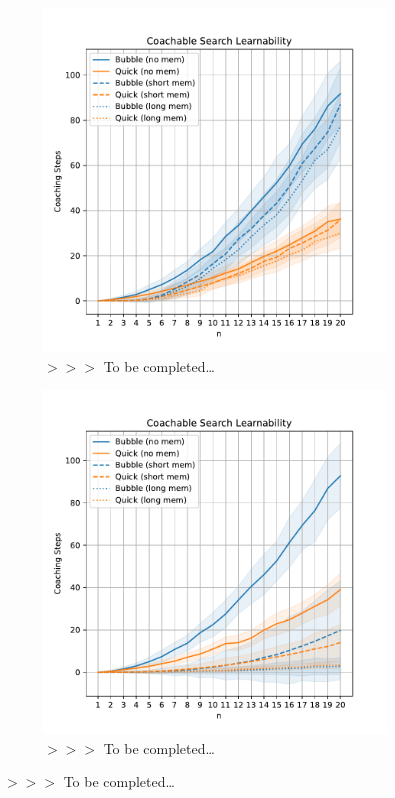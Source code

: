 \documentclass{ecai}
\newcommand{\edcom}[1]{{\sf\color{red}$>>>$ #1}}
\newcommand{\tbc}{\edcom{To be completed\ldots}}
\begin{document}
	\begin{figure}[!tb]
		\centering%
		\hfill%
		\begin{subfigure}[t]{0.47\textwidth}
			\centering
			\includegraphics[width=\linewidth]{../CLARIF-i-stable/plots/full_condition_learnability.pdf}
			\caption{\tbc}
			\label{fig:full sorting coaching results}
		\end{subfigure}%
		\hfill%
		\begin{subfigure}[t]{0.47\textwidth}
			\centering
			\includegraphics[width=\linewidth]{../CLARIF-i-stable/plots/partial_condition_learnability.pdf}
			\caption{\tbc}
			\label{fig:partial sorting coaching results}
		\end{subfigure}%
		\hfill%
		\caption{\tbc}
		\label{fig:full and partial sorting coaching results}
	\end{figure}
\end{document}
